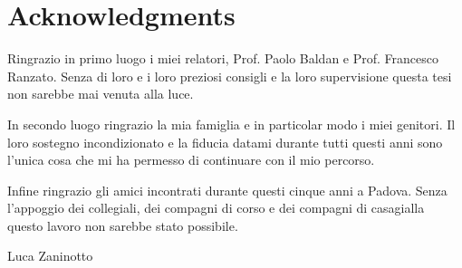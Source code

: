 
\begingroup

\chapter*{Acknowledgments}

Ringrazio in primo luogo i miei relatori, Prof. Paolo Baldan e
Prof. Francesco Ranzato. Senza di loro e i loro preziosi consigli e la
loro supervisione questa tesi non sarebbe mai venuta alla luce.

\medskip

In secondo luogo ringrazio la mia famiglia e in particolar modo i miei
genitori. Il loro sostegno incondizionato e la fiducia datami durante
tutti questi anni sono l'unica cosa che mi ha permesso di continuare
con il mio percorso.

\medskip

Infine ringrazio gli amici incontrati durante questi cinque anni a
Padova. Senza l'appoggio dei collegiali, dei compagni di corso e dei
compagni di casagialla questo lavoro non sarebbe stato possibile.

\hfill Luca Zaninotto

\endgroup
